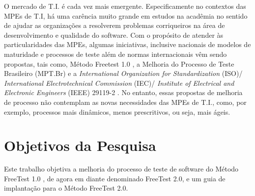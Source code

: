 O mercado de T.I. é cada vez mais emergente. Especificamente no contextos das MPEs de T.I, há uma carência muito grande em estudos na acadêmia no sentido de ajudar as organizações a resolverem problemas corriqueiros na área de desenvolvimento e qualidade do software. Com o propósito de atender às particularidades das MPEs, algumas iniciativas, inclusive nacionais de modelos de maturidade e processos de teste além de normas internacionais vêm sendo propostas, tais como, Método Freetest 1.0 \cite{Camilo-junior2012}, a Melhoria do Processo de Teste Brasileiro (MPT.Br) \cite{GuiaMPTbr} e a \textit{International Organization for Standardization} (ISO)/ \textit{International Electrotechnical Commission} (IEC)/ \textit{Institute of Electrical and Electronic Engineers} (IEEE) 29119-2 \cite{Standard2013}. No entanto, essas propostas de melhoria de processo não contemplam as novas necessidades das MPEs de T.I., como, por exemplo, processos mais dinâmicos, menos prescritivos, ou seja, mais ágeis. 


\section{Objetivos da Pesquisa}
\label{cap:objetivos}

Este trabalho objetiva a melhoria do processo de teste de software do Método FreeTest 1.0 \cite{Camilo-junior2012}, de agora em diante denominado FreeTest 2.0, e um guia de implantação para o Método FreeTest 2.0.



